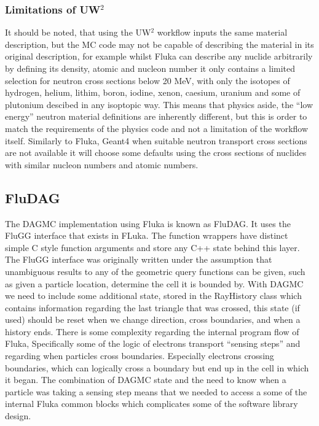 \subsubsection*{Limitations of UW$^2$}
It should be noted, that using the UW$^2$ workflow inputs the same material description, but the MC 
code may not be capable of describing the material in its original description, for example whilst
Fluka can describe any nuclide arbitrarily by defining its density, atomic and nucleon number it only
contains a limited selection for neutron cross sections below 20 MeV, with only the isotopes of 
hydrogen, helium, lithim, boron, iodine, xenon, caesium, uranium and some of plutonium descibed in
any isoptopic way. This means that physics aside, the ``low energy'' neutron material definitions are
inherently different, but this is order to match the requirements of the physics code and not a limitation 
of the workflow itself. Similarly to Fluka, Geant4 when suitable neutron transport cross sections are not 
available it will choose some defaults using the cross sections of nuclides with similar nucleon numbers
and atomic numbers.

\subsection{FluDAG}
\label{sec:fludag}
The DAGMC implementation using Fluka \cite{fluka} is known as FluDAG. It uses the FluGG \cite{flugg} interface that exists
in FLuka. The function wrappers have distinct simple C style function arguments and store any 
C++ state behind this layer. The FluGG interface was originally written under the assumption
that unambiguous results to any of the geometric query functions can be given, such as 
given a particle location, determine the cell it is bounded by. With DAGMC we need to include some
additional state, stored in the RayHistory class which contains information regarding the last triangle
that was crossed, this state (if used) should be reset when we change direction, cross boundaries, and
when a history ends. There is some complexity regarding the internal program flow of Fluka, Specifically
some of the logic of electrons transport ``sensing steps'' and regarding when particles cross boundaries. 
Especially electrons crossing boundaries, which can logically cross a boundary but end up in the cell in 
which it began. The combination of DAGMC state and the need to know when a particle was taking a sensing step 
means that we needed to access a some of the internal Fluka common blocks which complicates some of the
software library design.


